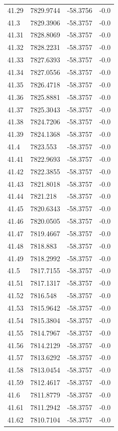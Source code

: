 \begin{table}[H]
\begin{tabular}{llll}
41.29 & 7829.9744 & -58.3756 & -0.0 \\
41.3 & 7829.3906 & -58.3757 & -0.0 \\
41.31 & 7828.8069 & -58.3757 & -0.0 \\
41.32 & 7828.2231 & -58.3757 & -0.0 \\
41.33 & 7827.6393 & -58.3757 & -0.0 \\
41.34 & 7827.0556 & -58.3757 & -0.0 \\
41.35 & 7826.4718 & -58.3757 & -0.0 \\
41.36 & 7825.8881 & -58.3757 & -0.0 \\
41.37 & 7825.3043 & -58.3757 & -0.0 \\
41.38 & 7824.7206 & -58.3757 & -0.0 \\
41.39 & 7824.1368 & -58.3757 & -0.0 \\
41.4 & 7823.553 & -58.3757 & -0.0 \\
41.41 & 7822.9693 & -58.3757 & -0.0 \\
41.42 & 7822.3855 & -58.3757 & -0.0 \\
41.43 & 7821.8018 & -58.3757 & -0.0 \\
41.44 & 7821.218 & -58.3757 & -0.0 \\
41.45 & 7820.6343 & -58.3757 & -0.0 \\
41.46 & 7820.0505 & -58.3757 & -0.0 \\
41.47 & 7819.4667 & -58.3757 & -0.0 \\
41.48 & 7818.883 & -58.3757 & -0.0 \\
41.49 & 7818.2992 & -58.3757 & -0.0 \\
41.5 & 7817.7155 & -58.3757 & -0.0 \\
41.51 & 7817.1317 & -58.3757 & -0.0 \\
41.52 & 7816.548 & -58.3757 & -0.0 \\
41.53 & 7815.9642 & -58.3757 & -0.0 \\
41.54 & 7815.3804 & -58.3757 & -0.0 \\
41.55 & 7814.7967 & -58.3757 & -0.0 \\
41.56 & 7814.2129 & -58.3757 & -0.0 \\
41.57 & 7813.6292 & -58.3757 & -0.0 \\
41.58 & 7813.0454 & -58.3757 & -0.0 \\
41.59 & 7812.4617 & -58.3757 & -0.0 \\
41.6 & 7811.8779 & -58.3757 & -0.0 \\
41.61 & 7811.2942 & -58.3757 & -0.0 \\
41.62 & 7810.7104 & -58.3757 & -0.0 \\

\end{tabular}
\end{table}

